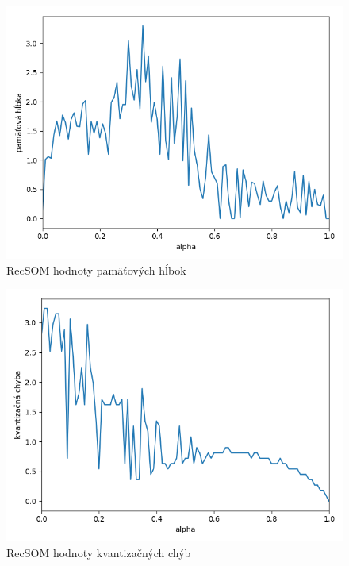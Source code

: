     \begin{figure}[H]
        \centering
        \includegraphics[width=\textwidth]{assets/r_memory_span}
        \caption{RecSOM hodnoty pamäťových hĺbok}
        \label{recsom_memory_span}
    \end{figure}
    
    \begin{figure}[H]
        \centering
        \includegraphics[width=\textwidth]{assets/r_errors}
        \caption{RecSOM hodnoty kvantizačných chýb}
        \label{recsom_errors}
    \end{figure}


